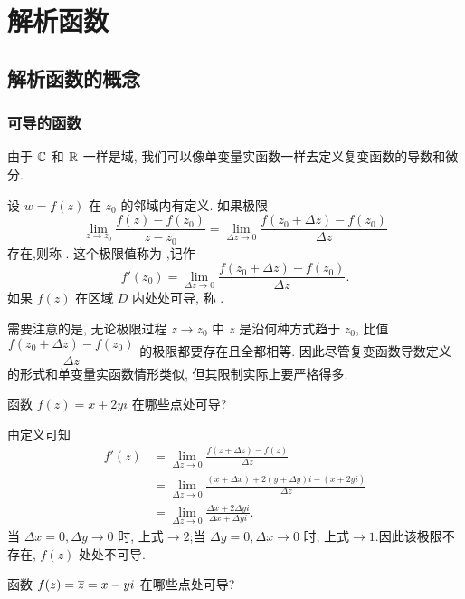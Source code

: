 
\chapter{解析函数}
\section{解析函数的概念}

\subsection{可导的函数}

由于 ${\mathbb{C}}$ 和 ${\mathbb{R}}$ 一样是域, 我们可以像单变量实函数一样去定义复变函数的导数和微分.

\begin{definition}
  设 $w=f(z)$ 在 $z_0$ 的邻域内有定义.
  如果极限
  \[
     \lim_{z\to z_0}\frac{f(z)-f(z_0)}{z-z_0}
    =\lim_{\Delta z\to 0}\frac{f(z_0+\Delta z)-f(z_0)}{\Delta z}
  \]
  存在,则称 .
  这个极限值称为 ,记作
  \[
    f'(z_0)=\lim_{\Delta z\to 0}\frac{f(z_0+\Delta z)-f(z_0)}{\Delta z}.
  \]
  如果 $f(z)$ 在区域 $D$ 内处处可导, 称 .
\end{definition}

需要注意的是, 无论极限过程 $z\to z_0$ 中 $z$ 是沿何种方式趋于 $z_0$, 比值 $\dfrac{f(z_0+\Delta z)-f(z_0)}{\Delta z}$ 的极限都要存在且全都相等. 因此尽管复变函数导数定义的形式和单变量实函数情形类似, 但其限制实际上要严格得多.

\begin{example}
  函数 $f(z)=x+2yi$ 在哪些点处可导?
\end{example}

\begin{solution}
  由定义可知
  \begin{align*}
    f'(z)&=\lim_{\Delta z\to 0}\frac{f(z+\Delta z)-f(z)}{\Delta z}\\
    &{=\lim_{\Delta z\to 0}\frac{(x+\Delta x)+2(y+\Delta y)i-(x+2yi)}{\Delta z}}\\
    &{=\lim_{\Delta z\to 0}\frac{\Delta x+2\Delta y i}{\Delta x+\Delta yi}.}
  \end{align*}
  当 $\Delta x=0, \Delta y\to 0$ 时, 上式$\to2$;当 $\Delta y=0, \Delta x\to 0$ 时, 上式$\to1$.因此该极限不存在, $f(z)$ 处处不可导.
\end{solution}

\begin{exercise}
  函数 $f(z)=\overline z=x-yi$ 在哪些点处可导? 
\end{exercise}

